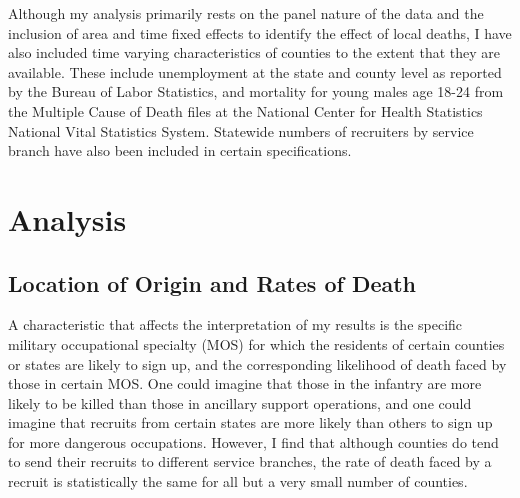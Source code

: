 \documentclass[12pt] {article}
\begin{document}
 


Although my analysis primarily rests on the panel nature of the data
and the inclusion of area and time fixed effects to identify the effect
of local deaths, I have also included time varying characteristics
of counties to the extent that they are available. These include unemployment
at the state and county level as reported by the Bureau of Labor Statistics, and mortality for young males age 18-24 from the Multiple Cause of Death files at the National Center for Health Statistics National Vital Statistics System. Statewide numbers of recruiters by service branch have also been included in certain specifications. 


\section{Analysis\label{sec:Analysis}}

\subsection{Location of Origin and Rates of Death\label{sec:deathrate}}
A characteristic that affects the interpretation
of my results is the specific military occupational specialty (MOS) for which the
residents of certain counties or states are likely to sign up, and the corresponding likelihood of death faced by those in certain MOS. One could imagine that those in the infantry are more likely to be killed than those in ancillary support operations, and one could imagine that recruits from certain states are more likely than others to sign up for more dangerous occupations. However, I find that although counties do tend to send their recruits to different service branches, the rate of death faced by a recruit is statistically the same for all but a very small number of counties.  %
\end{document}
